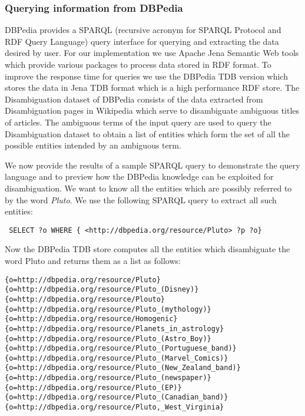 \documentclass[a4paper,12pt]{report}
\begin{document}
\subsubsection{Querying information from DBPedia}

DBPedia provides a SPARQL (recursive acronym for SPARQL Protocol and
RDF Query Language) query interface for querying and extracting the
data desired by user. For our implementation we use Apache Jena
Semantic Web tools which provide various packages to process data
stored in RDF format. To improve the response time for queries we use
the DBPedia TDB version which stores the data in Jena TDB format which
is a high performance RDF store. The Disambiguation dataset of DBPedia
consists of the data extracted from Disambiguation pages in Wikipedia
which serve to disambiguate ambiguous titles of articles. The
ambiguous terms of the input query are used to query the
Disambiguation dataset to obtain a list of entities which form the set
of all the possible entities intended by an ambiguous term.



We now provide the results of a sample SPARQL query to demonstrate the
query language and to preview how the DBPedia knowledge can be
exploited for disambiguation. We want to know all the entities which
are possibly referred to by the word {\it Pluto}. We use the following
SPARQL query to extract all such entities:

\begin{verbatim}
 SELECT ?o WHERE { <http://dbpedia.org/resource/Pluto> ?p ?o}
\end{verbatim}
Now the DBPedia TDB store computes all the entities which disambiguate
the word Pluto and returns them as a list as follows:
\begin{verbatim}
{o=http://dbpedia.org/resource/Pluto}
{o=http://dbpedia.org/resource/Pluto_(Disney)}
{o=http://dbpedia.org/resource/Plouto}
{o=http://dbpedia.org/resource/Pluto_(mythology)}
{o=http://dbpedia.org/resource/Homogenic}
{o=http://dbpedia.org/resource/Planets_in_astrology}
{o=http://dbpedia.org/resource/Pluto_(Astro_Boy)}
{o=http://dbpedia.org/resource/Pluto_(Portuguese_band)}
{o=http://dbpedia.org/resource/Pluto_(Marvel_Comics)}
{o=http://dbpedia.org/resource/Pluto_(New_Zealand_band)}
{o=http://dbpedia.org/resource/Pluto_(newspaper)}
{o=http://dbpedia.org/resource/Pluto_(EP)}
{o=http://dbpedia.org/resource/Pluto_(Canadian_band)}
{o=http://dbpedia.org/resource/Pluto,_West_Virginia}
\end{verbatim}
\end{document}
